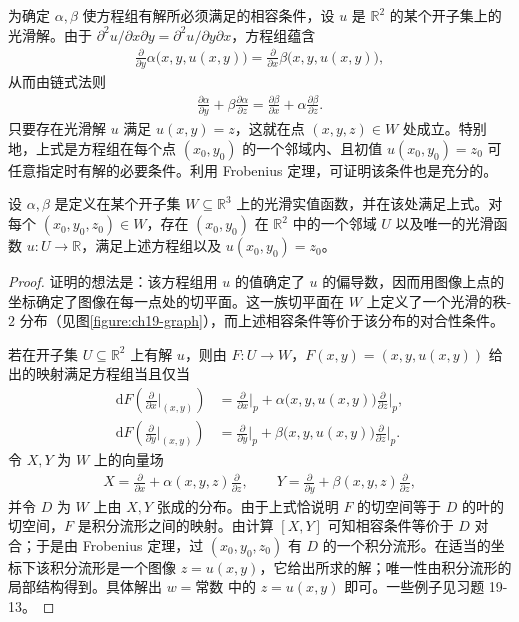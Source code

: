 \documentclass[../../main.tex]{subfiles}
\begin{document}
为确定 $\alpha,\beta$ 使方程组有解所必须满足的相容条件，设 $u$ 是 $\mathbb{R}^2$ 的某个开子集上的光滑解。由于 $\partial^2u/\partial x\partial y=\partial^2u/\partial y\partial x$，方程组蕴含
\begin{align*}
\frac{\partial}{\partial y}\alpha\bigl(x,y,u(x,y)\bigr)=\frac{\partial}{\partial x}\beta\bigl(x,y,u(x,y)\bigr),
\end{align*}
从而由链式法则
\begin{align}
\frac{\partial\alpha}{\partial y}+\beta\frac{\partial\alpha}{\partial z}=\frac{\partial\beta}{\partial x}+\alpha\frac{\partial\beta}{\partial z}.
\end{align}
只要存在光滑解 $u$ 满足 $u(x,y)=z$，这就在点 $(x,y,z)\in W$ 处成立。特别地，上式是方程组在每个点 $(x_0,y_0)$ 的一个邻域内、且初值 $u(x_0,y_0)=z_0$ 可任意指定时有解的必要条件。利用 Frobenius 定理，可证明该条件也是充分的。

\begin{proposition}\label{proposition:ch19-超定非线性}
设 $\alpha,\beta$ 是定义在某个开子集 $W\subseteq\mathbb{R}^3$ 上的光滑实值函数，并在该处满足上式。对每个 $(x_0,y_0,z_0)\in W$，存在 $(x_0,y_0)$ 在 $\mathbb{R}^2$ 中的一个邻域 $U$ 以及唯一的光滑函数 $u\colon U\to\mathbb{R}$，满足上述方程组以及 $u(x_0,y_0)=z_0$。
\end{proposition}

\begin{proof}
证明的想法是：该方程组用 $u$ 的值确定了 $u$ 的偏导数，因而用图像上点的坐标确定了图像在每一点处的切平面。这一族切平面在 $W$ 上定义了一个光滑的秩-$2$ 分布（见图\cref{figure:ch19-graph}），而上述相容条件等价于该分布的对合性条件。

若在开子集 $U\subseteq\mathbb{R}^2$ 上有解 $u$，则由 $F\colon U\to W$，$F(x,y)=(x,y,u(x,y))$ 给出的映射满足方程组当且仅当
\begin{align*}
\mathrm{d}F\left(\frac{\partial}{\partial x}\bigg|_{(x,y)}\right)&=\frac{\partial}{\partial x}\bigg|_p+\alpha\bigl(x,y,u(x,y)\bigr)\frac{\partial}{\partial z}\bigg|_p,\\
\mathrm{d}F\left(\frac{\partial}{\partial y}\bigg|_{(x,y)}\right)&=\frac{\partial}{\partial y}\bigg|_p+\beta\bigl(x,y,u(x,y)\bigr)\frac{\partial}{\partial z}\bigg|_p.
\end{align*}
令 $X,Y$ 为 $W$ 上的向量场
\begin{align}
X=\frac{\partial}{\partial x}+\alpha(x,y,z)\frac{\partial}{\partial z},\qquad
Y=\frac{\partial}{\partial y}+\beta(x,y,z)\frac{\partial}{\partial z},
\end{align}
并令 $D$ 为 $W$ 上由 $X,Y$ 张成的分布。由于上式恰说明 $F$ 的切空间等于 $D$ 的叶的切空间，$F$ 是积分流形之间的映射。由计算 $[X,Y]$ 可知相容条件等价于 $D$ 对合；于是由 Frobenius 定理，过 $(x_0,y_0,z_0)$ 有 $D$ 的一个积分流形。在适当的坐标下该积分流形是一个图像 $z=u(x,y)$，它给出所求的解；唯一性由积分流形的局部结构得到。具体解出 $w=\text{常数}$ 中的 $z=u(x,y)$ 即可。一些例子见习题 19-13。
\end{proof}
\end{document}
